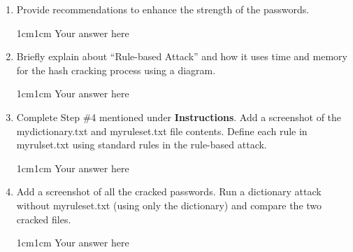 \documentclass[11pt,letterpaper]{article}
\newenvironment{answer}{\em \color{blue} \begin{adjustwidth}{1cm}{1cm}}{\end{adjustwidth}}
\begin{document}
\begin{enumerate}
		\item Provide recommendations to enhance the strength of the passwords.
		
		\begin{answer}
			Your answer here
		\end{answer}
		
		\item Briefly explain about ``Rule-based Attack'' and how it uses time and memory for the hash cracking process using a diagram.
		
		\begin{answer}
			Your answer here
		\end{answer}
		
		\item Complete Step \#4 mentioned under \textbf{Instructions}. Add a screenshot of the mydictionary.txt and myruleset.txt file contents. Define each rule in myrulset.txt using standard rules in the rule-based attack.
		
		\begin{answer}
			Your answer here
		\end{answer}
		
		\item Add a screenshot of all the cracked passwords. Run a dictionary attack without myruleset.txt (using only the dictionary) and compare the two cracked files.
		
		\begin{answer}
			Your answer here
		\end{answer}
		
	\end{enumerate}
	
\end{document}
